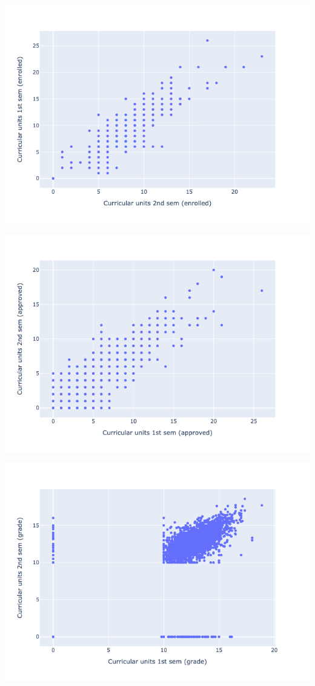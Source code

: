 \documentclass[
  letterpaper,
  DIV=11,
  numbers=noendperiod]{scrartcl}
\begin{document}
\includegraphics{report_AzadhdhinNedalYunisAlFraijat_files/figure-pdf/cell-50-output-1.png}

\includegraphics{report_AzadhdhinNedalYunisAlFraijat_files/figure-pdf/cell-51-output-1.png}

\includegraphics{report_AzadhdhinNedalYunisAlFraijat_files/figure-pdf/cell-52-output-1.png}
\end{document}
